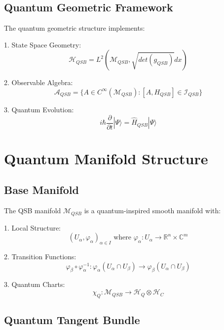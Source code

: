 \documentclass[12pt]{article}
\begin{document}
\subsection{Quantum Geometric Framework}

The quantum geometric structure implements:

1. State Space Geometry:
\begin{equation}
\mathcal{H}_{QSB} = L^2(\mathcal{M}_{QSB}, \sqrt{det(g_{QSB})} dx)
\end{equation}

2. Observable Algebra:
\begin{equation}
\mathcal{A}_{QSB} = \{A \in C^\infty(\mathcal{M}_{QSB}) : [A,H_{QSB}] \in \mathcal{I}_{QSB}\}
\end{equation}

3. Quantum Evolution:
\begin{equation}
i\hbar \frac{\partial}{\partial t}|\Psi\rangle = \hat{H}_{QSB}|\Psi\rangle
\end{equation}

\section{Quantum Manifold Structure}

\subsection{Base Manifold}

The QSB manifold $\mathcal{M}_{QSB}$ is a quantum-inspired smooth manifold with:

1. Local Structure:
\begin{equation}
(U_\alpha, φ_\alpha)_{\alpha \in I} \text{ where } φ_\alpha: U_\alpha \rightarrow \mathbb{R}^n \times \mathbb{C}^m
\end{equation}

2. Transition Functions:
\begin{equation}
φ_\beta \circ φ_\alpha^{-1}: φ_\alpha(U_\alpha \cap U_\beta) \rightarrow φ_\beta(U_\alpha \cap U_\beta)
\end{equation}

3. Quantum Charts:
\begin{equation}
\chi_Q: \mathcal{M}_{QSB} \rightarrow \mathcal{H}_Q \otimes \mathcal{H}_C
\end{equation}

\subsection{Quantum Tangent Bundle}
\end{document}

